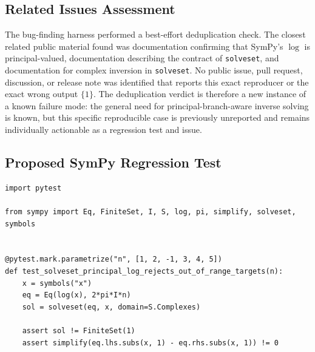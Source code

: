 \documentclass[11pt]{article}
\begin{document}
\subsection{Related Issues Assessment}

The bug-finding harness performed a best-effort deduplication check.  The
closest related public material found was documentation confirming that
SymPy's \(\log\) is principal-valued, documentation describing the contract of
\texttt{solveset}, and documentation for complex inversion in \texttt{solveset}.
No public issue, pull request, discussion, or release note was identified that
reports this exact reproducer or the exact wrong output \(\{1\}\).  The
deduplication verdict is therefore a new instance of a known failure mode: the
general need for principal-branch-aware inverse solving is known, but this
specific reproducible case is previously unreported and remains individually
actionable as a regression test and issue.

\subsection{Proposed SymPy Regression Test}

\medskip

\begin{lstlisting}[style=bugpython]
import pytest

from sympy import Eq, FiniteSet, I, S, log, pi, simplify, solveset, symbols


@pytest.mark.parametrize("n", [1, 2, -1, 3, 4, 5])
def test_solveset_principal_log_rejects_out_of_range_targets(n):
    x = symbols("x")
    eq = Eq(log(x), 2*pi*I*n)
    sol = solveset(eq, x, domain=S.Complexes)

    assert sol != FiniteSet(1)
    assert simplify(eq.lhs.subs(x, 1) - eq.rhs.subs(x, 1)) != 0
\end{lstlisting}
\end{document}
